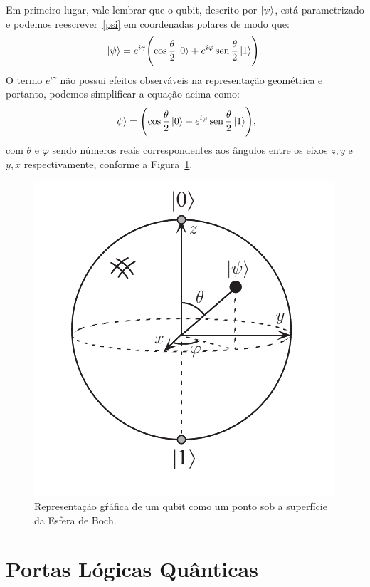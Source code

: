 Em primeiro lugar, vale lembrar que o qubit, descrito por $\ket{\psi}$, está parametrizado e podemos reescrever~\eqref{psi} em coordenadas polares de modo que:
\begin{equation}
\ket{\psi}=e^{i \gamma}\Biggl(\cos \frac{\theta}{2}\ket{0}+e^{i \varphi} \operatorname{sen} \frac{\theta}{2}\ket{1}\Biggr).
\end{equation}
O termo \(e^{i\gamma}\) não possui efeitos observáveis na representação geométrica e portanto, podemos simplificar a equação acima como:
\begin{equation}
\ket{\psi}=\Biggl(\cos \frac{\theta}{2}\ket{0}+e^{i \varphi} \operatorname{sen} \frac{\theta}{2}\ket{1}\Biggr),
\end{equation}
com $\theta$ e $\varphi$ sendo números reais correspondentes aos ângulos entre os eixos $z, y$ e $y, x$ respectivamente, conforme a
Figura~\ref{boch}.

\begin{figure}[ht!]
\centering
\caption{Representação gŕáfica de um qubit como um ponto sob a superfície da Esfera de Boch.}\label{boch}
\includegraphics[width=0.5\linewidth]{boch.png}
\end{figure}


\section{Portas Lógicas Quânticas}

